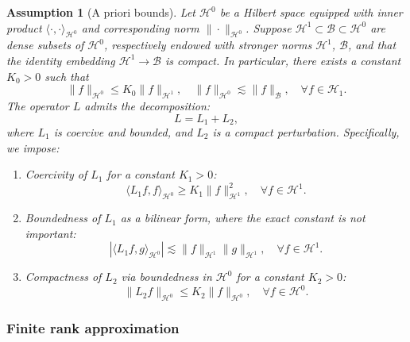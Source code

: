 \documentclass[11pt,a4paper]{article}
\numberwithin{equation}{section}
\newcommand{\cdummy}{\cdot}
\newenvironment{enumeratenumeric}{\begin{enumerate}[1.] }{\end{enumerate}}
\newtheorem{assumption}{Assumption}
\begin{document}
\begin{assumption}[A priori bounds]
  \label{asm:linear op}Let $\mathcal{H}^0$ be a Hilbert space equipped with
  inner product $\langle \cdummy, \cdummy \rangle_{\mathcal{H}^0}$ and
  corresponding norm $\| \cdummy \|_{\mathcal{H}^0}$. Suppose  $\mathcal{H}^1\subset \mathcal{B}\subset \mathcal{H}^0$ are  dense subsets of $\mathcal{H}^0$, respectively endowed with stronger norms ${\mathcal{H}^1}$, ${\mathcal{B}}$, and that the identity embedding $\mathcal{H}^1\to \mathcal{B}$ is compact. In particular, there exists a constant $K_0 > 0$ such that \begin{equation}
      \| f \|_{\mathcal{H}^0} \leqslant K_0 \| f \|_{\mathcal{H}^1}, \quad  \| f \|_{\mathcal{H}^0} \lesssim \| f \|_{\mathcal{B}}, \quad
      \forall f \in \mathcal{H}_1.  \label{eq:embed}
    \end{equation}
    The operator
  $L$ admits the decomposition:
  \[ L = L_1 + L_2 , \]
  where $L_1$ is coercive and bounded, and $L_2$ is a compact perturbation. Specifically, we impose:
  \begin{enumeratenumeric}
    \item Coercivity of $L_1$ for a constant $K_1 > 0$:
    \begin{equation}
      \langle L_1 f, f \rangle_{\mathcal{H}^0} \geqslant K_1 \| f
      \|_{\mathcal{H}^1}^2, \quad \forall f \in \mathcal{H}^1.
      \label{eq:coercive}
    \end{equation}

    \item Boundedness of $L_1$ as a bilinear form, where the exact constant is not important:
    \begin{equation}
      |\langle L_1 f, g \rangle_{\mathcal{H}^0}| \lesssim \| f
      \|_{\mathcal{H}^1}\| g
      \|_{\mathcal{H}^1}, \quad \forall f \in \mathcal{H}^1.
      \label{asm:lax}
    \end{equation}
    
    \item Compactness of $L_2$ via boundedness in $\mathcal{H}^0$ for a constant $K_2 > 0$:
    \begin{equation}
      \| L_2 f \|_{\mathcal{H}^0} \leqslant K_2 \| f \|_{\mathcal{H}^0}, \quad
      \forall f \in \mathcal{H}^0.\label{eq:L2 bound}
    \end{equation}
  \end{enumeratenumeric}
\end{assumption}
\subsubsection{Finite rank approximation}\label{subsub fr}
\end{document}
